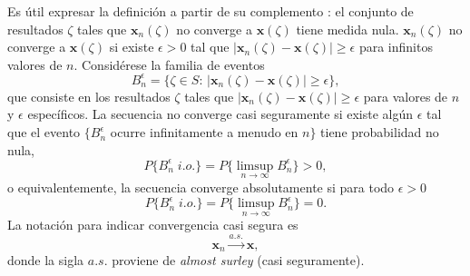 \documentclass[a4paper]{report}
\newcommand{\x}{\mathbf{x}}
\begin{document}
\begin{itemize}
 Es útil expresar la definición a partir de su complemento \cite{kupferman09lectures}: el conjunto de resultados \(\zeta\) tales que \(\x_n(\zeta)\) no converge a \(\x(\zeta)\) tiene medida nula. \(\x_n(\zeta)\) no converge a \(\x(\zeta)\) si existe \(\epsilon>0\) tal que \(|\x_n(\zeta)-\x(\zeta)|\geq\epsilon\) para infinitos valores de \(n\). Considérese la familia de eventos
 \[
  B_n^\epsilon=\{\zeta\in S:\,|\x_n(\zeta)-\x(\zeta)|\geq\epsilon\},
 \]
 que consiste en los resultados \(\zeta\) tales que \(|\x_n(\zeta)-\x(\zeta)|\geq\epsilon\) para valores de \(n\) y \(\epsilon\) específicos. La secuencia no converge casi seguramente si existe algún \(\epsilon\) tal que el evento \(\{B_n^\epsilon\) ocurre infinitamente a menudo en \(n\}\) tiene probabilidad no nula,
 \begin{equation}\label{eq:almost_sure_convergence_tmp_1}
  P\{B_n^\epsilon\;i.o.\}=P\{\limsup_{n\to\infty}B_n^\epsilon\}>0,
 \end{equation}
o equivalentemente, la secuencia converge absolutamente si para todo \(\epsilon>0\)
\begin{equation}\label{eq:almost_sure_convergence_tmp_2}
 P\{B_n^\epsilon\;i.o.\}=P\{\limsup_{n\to\infty}B_n^\epsilon\}=0.
\end{equation}
 La notación para indicar convergencia casi segura es 
 \[
  \x_n\overset{a.s.}{\longrightarrow}\x,
 \] 
 donde la sigla \(a.s.\) proviene de \emph{almost surley} (casi seguramente).
 

\end{itemize}
\end{document}

